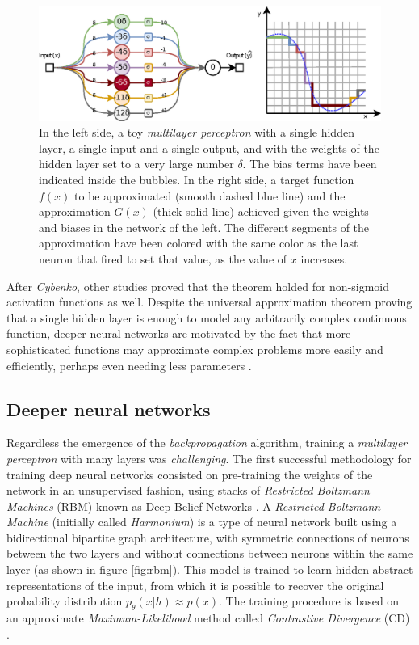 \begin{figure}
	\centering
	\includegraphics[width=1\linewidth]{chapter2/images/universalapprox}
	\caption{In the left side, a toy \textit{multilayer perceptron} with a single hidden layer, a single input and a single output, and with the weights of the hidden layer set to a very large number $\delta$. The bias terms have been indicated inside the bubbles. In the right side, a target function $f(x)$ to be approximated (smooth dashed blue line) and the approximation $G(x)$ (thick solid line) achieved given the weights and biases in the network of the left. The different segments of the approximation have been colored with the same color as the last neuron that fired to set that value, as the value of $x$ increases.}
	\label{fig:universalapprox}
\end{figure}

After \textit{Cybenko}, other studies \autocite{Leshno1993, pinkus1999} proved that the theorem holded for non-sigmoid activation functions as well. Despite the universal approximation theorem proving that a single hidden layer is enough to model any arbitrarily complex continuous function, deeper neural networks are motivated by the fact that more sophisticated functions may approximate complex problems more easily and efficiently, perhaps even needing less parameters \autocite{nguyen21}.



\subsection{Deeper neural networks} \label{sec:deepernn}
Regardless the emergence of the \textit{backpropagation} algorithm, training a \textit{multilayer perceptron} with many layers was \textit{challenging}. The first successful methodology for training deep neural networks consisted on pre-training the weights of the network in an unsupervised fashion, using stacks of \textit{Restricted Boltzmann Machines} (RBM) \autocite{Smolensky1986} known as Deep Belief Networks \autocite{hinton2006, Bengio2007}. A \textit{Restricted Boltzmann Machine} (initially called \textit{Harmonium}) is a type of neural network built using a bidirectional bipartite graph architecture, with symmetric connections of neurons between the two layers and without connections between neurons within the same layer (as shown in figure \ref{fig:rbm}). This model is trained to learn hidden abstract representations of the input, from which it is possible to recover the original probability distribution $p_\theta(x|h) \approx p(x)$. The training procedure is based on an approximate \textit{Maximum-Likelihood} method called \textit{Contrastive Divergence} (CD) \autocite{hinton2002}.


